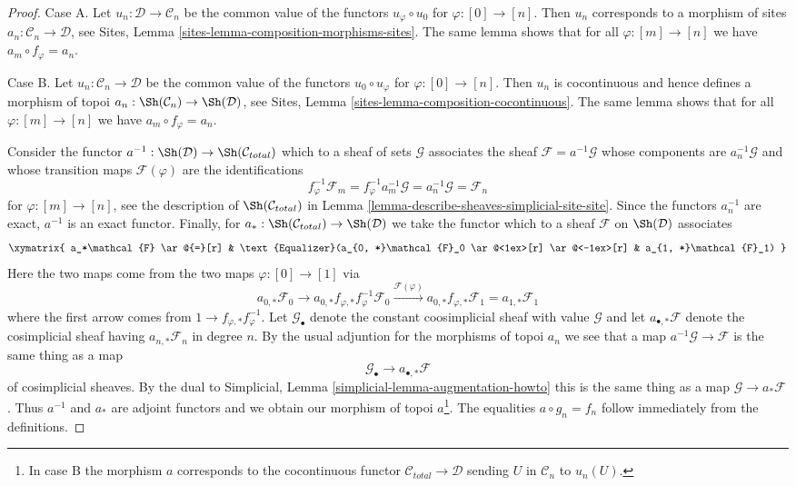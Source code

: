 \begin{proof}
Case A. Let $u_n : \mathcal{D} \to \mathcal{C}_n$ be the common
value of the functors $u_\varphi \circ u_0$ for $\varphi : [0] \to [n]$.
Then $u_n$ corresponds to a morphism of sites
$a_n : \mathcal{C}_n \to \mathcal{D}$, see
Sites, Lemma \ref{sites-lemma-composition-morphisms-sites}.
The same lemma shows that for all $\varphi : [m] \to [n]$ we have
$a_m \circ f_\varphi = a_n$.

\medskip\noindent
Case B. Let $u_n : \mathcal{C}_n \to \mathcal{D}$ be the common
value of the functors $u_0 \circ u_\varphi$ for $\varphi : [0] \to [n]$.
Then $u_n$ is cocontinuous and hence defines a morphism of topoi
$a_n : \Sh(\mathcal{C}_n) \to \Sh(\mathcal{D)}$, see
Sites, Lemma \ref{sites-lemma-composition-cocontinuous}.
The same lemma shows that for all $\varphi : [m] \to [n]$ we have
$a_m \circ f_\varphi = a_n$.

\medskip\noindent
Consider the functor $a^{-1} : \Sh(\mathcal{D}) \to \Sh(\mathcal{C}_{total})$
which to a sheaf of sets $\mathcal{G}$ associates the sheaf
$\mathcal{F} = a^{-1}\mathcal{G}$ whose components are $a_n^{-1}\mathcal{G}$
and whose transition maps $\mathcal{F}(\varphi)$ are the identifications
$$
f_\varphi^{-1}\mathcal{F}_m =
f_\varphi^{-1} a_m^{-1}\mathcal{G} =
a_n^{-1}\mathcal{G} =
\mathcal{F}_n
$$
for $\varphi : [m] \to [n]$, see the description of
$\Sh(\mathcal{C}_{total})$ in
Lemma \ref{lemma-describe-sheaves-simplicial-site-site}.
Since the functors $a_n^{-1}$ are exact, $a^{-1}$ is an exact functor.
Finally, for $a_* : \Sh(\mathcal{C}_{total}) \to \Sh(\mathcal{D})$
we take the functor which to a sheaf $\mathcal{F}$ on $\Sh(\mathcal{D})$
associates
$$
\xymatrix{
a_*\mathcal{F} \ar@{=}[r] &
\text{Equalizer}(a_{0, *}\mathcal{F}_0
\ar@<1ex>[r] \ar@<-1ex>[r] &
a_{1, *}\mathcal{F}_1)
}
$$
Here the two maps come from the two maps $\varphi : [0] \to [1]$
via
$$
a_{0, *}\mathcal{F}_0 \to
a_{0, *}f_{\varphi, *} f_\varphi^{-1}\mathcal{F}_0
\xrightarrow{\mathcal{F}(\varphi)}
a_{0, *}f_{\varphi, *} \mathcal{F}_1 = a_{1, *}\mathcal{F}_1
$$
where the first arrow comes from $1 \to f_{\varphi, *} f_\varphi^{-1}$.
Let $\mathcal{G}_\bullet$ denote the constant coosimplicial sheaf
with value $\mathcal{G}$ and let $a_{\bullet, *}\mathcal{F}$
denote the cosimplicial sheaf having $a_{n, *}\mathcal{F}_n$ in degree $n$.
By the usual adjuntion for the morphisms of topoi $a_n$ we see that
a map $a^{-1}\mathcal{G} \to \mathcal{F}$
is the same thing as a map
$$
\mathcal{G}_\bullet \longrightarrow a_{\bullet, *}\mathcal{F}
$$
of cosimplicial sheaves.
By the dual to Simplicial, Lemma \ref{simplicial-lemma-augmentation-howto}
this is the same thing as a map $\mathcal{G} \to a_*\mathcal{F}$.
Thus $a^{-1}$ and $a_*$ are adjoint functors and we obtain
our morphism of topoi $a$\footnote{In case B the morphism $a$
corresponds to the cocontinuous functor
$\mathcal{C}_{total} \to \mathcal{D}$ sending
$U$ in $\mathcal{C}_n$ to $u_n(U)$.}. The equalities
$a \circ g_n = f_n$ follow immediately from the definitions.
\end{proof}



